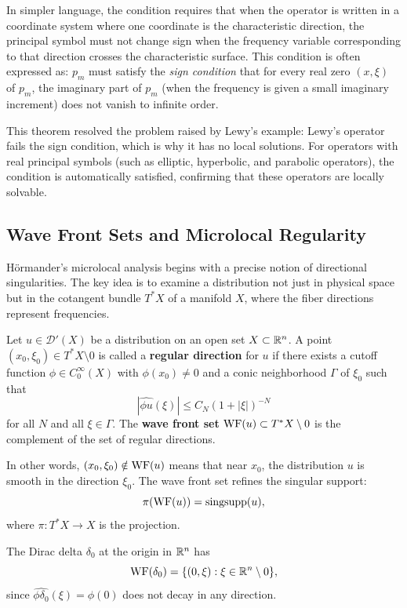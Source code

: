 In simpler language, the condition requires that when the operator is
written in a coordinate system where one coordinate is the
characteristic direction, the principal symbol must not change sign
when the frequency variable corresponding to that direction crosses the
characteristic surface. This condition is often expressed as: \(p_m\)
must satisfy the \textit{sign condition} that for every real zero
\((x,\xi)\) of \(p_m\), the imaginary part of \(p_m\) (when the
frequency is given a small imaginary increment) does not vanish to
infinite order.

This theorem resolved the problem raised by Lewy's example: Lewy's
operator fails the sign condition, which is why it has no local
solutions. For operators with real principal symbols (such as elliptic,
hyperbolic, and parabolic operators), the condition is automatically
satisfied, confirming that these operators are locally solvable.

\subsection{Wave Front Sets and Microlocal Regularity}

H\"ormander's microlocal analysis begins with a precise notion of
directional singularities. The key idea is to examine a distribution
not just in physical space but in the cotangent bundle \(T^*X\) of a
manifold \(X\), where the fiber directions represent frequencies.

\begin{definition}
Let \(u \in \mathcal{D}'(X)\) be a distribution on an open set
\(X \subset \mathbb{R}^n\). A point \((x_0, \xi_0) \in T^*X \setminus 0\) is
called a \textbf{regular direction} for \(u\) if there exists a
cutoff function \(\phi \in C_0^\infty(X)\) with \(\phi(x_0) \neq 0\)
and a conic neighborhood \(\Gamma\) of \(\xi_0\) such that
\[
|\widehat{\phi u}(\xi)| \leq C_N (1+|\xi|)^{-N}
\]
for all \(N\) and all \(\xi \in \Gamma\). The \textbf{wave front set}
\(\operatorname{WF}(u) \subset T^*X \setminus 0\) is the complement of the set of
regular directions.
\end{definition}

In other words, \((x_0, \xi_0) \notin \operatorname{WF}(u)\) means that near \(x_0\),
the distribution \(u\) is smooth in the direction \(\xi_0\). The wave
front set refines the singular support:
\[
\pi(\operatorname{WF}(u)) = \operatorname{singsupp}(u),
\]
where \(\pi: T^*X \to X\) is the projection.

\begin{example}
The Dirac delta \(\delta_0\) at the origin in \(\mathbb{R}^n\) has
\[
\operatorname{WF}(\delta_0) = \{(0, \xi) : \xi \in \mathbb{R}^n \setminus 0\},
\]
since \(\widehat{\phi\delta_0}(\xi) = \phi(0)\) does not decay in any
direction.
\end{example}

